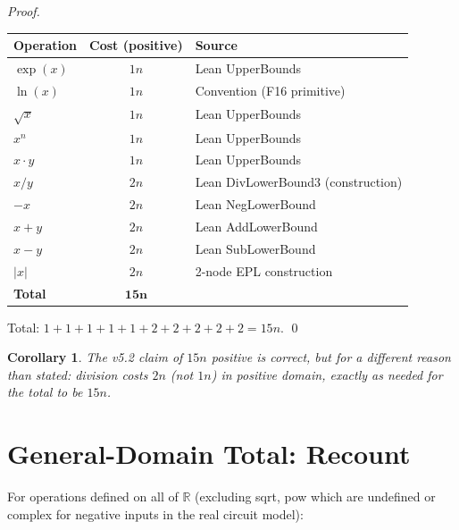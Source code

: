 \documentclass[11pt]{article}
\newtheorem{corollary}[theorem]{Corollary}
\begin{document}
\begin{proof}
\begin{center}
\begin{tabular}{lcl}
\toprule
Operation & Cost (positive) & Source \\
\midrule
$\exp(x)$    & $1n$ & Lean UpperBounds \\
$\ln(x)$     & $1n$ & Convention (F16 primitive) \\
$\sqrt{x}$   & $1n$ & Lean UpperBounds \\
$x^n$        & $1n$ & Lean UpperBounds \\
$x \cdot y$  & $1n$ & Lean UpperBounds \\
$x / y$      & $2n$ & Lean DivLowerBound3 (construction) \\
$-x$         & $2n$ & Lean NegLowerBound \\
$x + y$      & $2n$ & Lean AddLowerBound \\
$x - y$      & $2n$ & Lean SubLowerBound \\
$|x|$        & $2n$ & 2-node EPL construction \\
\midrule
\textbf{Total} & $\mathbf{15n}$ & \\
\bottomrule
\end{tabular}
\end{center}
Total: $1+1+1+1+1+2+2+2+2+2 = 15n$. \qed
\end{proof}

\begin{corollary}
The v5.2 claim of $15n$ positive is \emph{correct}, but for a different reason
than stated: division costs $2n$ (not $1n$) in positive domain, exactly as needed
for the total to be $15n$.
\end{corollary}

\section{General-Domain Total: Recount}

For operations defined on all of $\mathbb{R}$ (excluding sqrt, pow which are undefined or complex
for negative inputs in the real circuit model):
\end{document}
